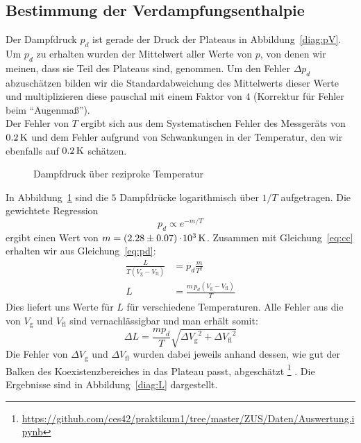 \subsection{Bestimmung der Verdampfungsenthalpie}

Der Dampfdruck $p_d$ ist gerade der Druck der Plateaus in Abbildung~\ref{diag:pV}. Um $p_d$ zu erhalten wurden der Mittelwert aller Werte von $p$, von denen wir meinen, dass sie Teil des Plateaus sind, genommen. Um den Fehler $\Delta p_d$ abzuschätzen bilden wir die Standardabweichung des Mittelwerts dieser Werte und multiplizieren diese pauschal mit einem Faktor von $4$ (Korrektur für Fehler beim "`Augenmaß"'). \\
%
Der Fehler von $T$ ergibt sich aus dem Systematischen Fehler des Messgeräts von $\unit[0.2]{K}$ und dem Fehler aufgrund von Schwankungen in der Temperatur, den wir ebenfalls auf $\unit[0.2]{K}$ schätzen.
%
\begin{figure}    
    
    \caption{Dampfdruck über reziproke Temperatur}
    \label{diag:arr}
\end{figure}
%
In Abbildung~\ref{diag:arr} sind die $5$ Dampfdrücke logarithmisch über $1/T$ aufgetragen. Die gewichtete Regression
%
\begin{equation}
p_d \propto e^{-m/T} \label{eq:pd}
\end{equation}
%
ergibt einen Wert von $m = \unit[(2.28 \pm 0.07)\e3]{K}$. Zusammen mit Gleichung~\ref{eq:cc} erhalten wir aus Gleichung~\ref{eq:pd}:
\begin{align*}
    \frac{L}{T (V_\mathrm{g} - V_\mathrm{fl})} &= p_d \frac{m}{T^2} \\
                                             L &= \frac{m \, p_d (V_\mathrm{g} - V_\mathrm{fl})}{T}
\end{align*}
%
Dies liefert uns Werte für $L$ für verschiedene Temperaturen. Alle Fehler aus die von $V_\mathrm{g}$ und $V_\mathrm{fl}$ sind vernachlässigbar und man erhält somit:
\[
    \Delta L = \frac{m p_d}{T} \sqrt{{\Delta V_\mathrm{g}}^2 + {\Delta V_\mathrm{fl}}^2}
\]
Die Fehler von $\Delta V_\mathrm{g}$ und $\Delta V_\mathrm{fl}$ wurden dabei jeweils anhand dessen, wie gut der Balken des Koexistenzbereiches in das Plateau passt, abgeschätzt%
\footnote{\url{https://github.com/ces42/praktikum1/tree/master/ZUS/Daten/Auswertung.ipynb}}%
. Die Ergebnisse sind in Abbildung~\ref{diag:L} dargestellt.

